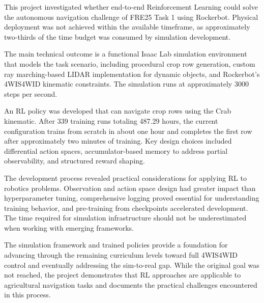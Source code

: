\documentclass[11pt,a4paper,twocolumn]{article}
\begin{document}
This project investigated whether end-to-end Reinforcement Learning could solve the autonomous navigation challenge of FRE25 Task 1 using Rockerbot. Physical deployment was not achieved within the available timeframe, as approximately two-thirds of the time budget was consumed by simulation development.

The main technical outcome is a functional Isaac Lab simulation environment that models the task scenario, including procedural crop row generation, custom ray marching-based LIDAR implementation for dynamic objects, and Rockerbot's 4WIS4WID kinematic constraints. The simulation runs at approximately 3000 steps per second.

An RL policy was developed that can navigate crop rows using the Crab kinematic. After 339 training runs totaling 487.29 hours, the current configuration trains from scratch in about one hour and completes the first row after approximately two minutes of training. Key design choices included differential action spaces, accumulator-based memory to address partial observability, and structured reward shaping.

The development process revealed practical considerations for applying RL to robotics problems. Observation and action space design had greater impact than hyperparameter tuning, comprehensive logging proved essential for understanding training behavior, and pre-training from checkpoints accelerated development. The time required for simulation infrastructure should not be underestimated when working with emerging frameworks.

The simulation framework and trained policies provide a foundation for advancing through the remaining curriculum levels toward full 4WIS4WID control and eventually addressing the sim-to-real gap. While the original goal was not reached, the project demonstrates that RL approaches are applicable to agricultural navigation tasks and documents the practical challenges encountered in this process.


\end{document}
